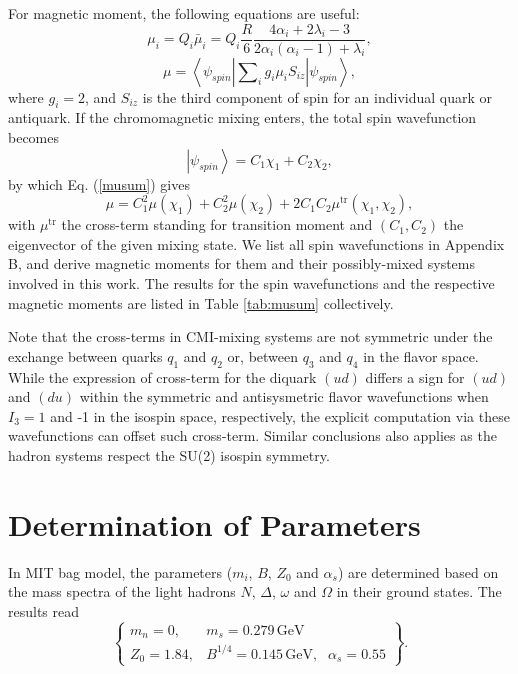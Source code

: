 \documentclass[prd,twocolumn,floatfix,nofootinbib]{revtex4}
\begin{document}
For magnetic moment, the following equations \cite%
{DeGrand:1975cf,Wang:2016dzu} are useful:
\begin{equation}
\mu _{i}=Q_{i}\bar{\mu}_{i}=Q_{i}\frac{R}{6}\frac{4\alpha _{i}+2\lambda
_{i}-3}{2\alpha _{i}\left( \alpha _{i}-1\right) +\lambda _{i}},  \label{mui}
\end{equation}%
\begin{equation}
\mu =\left\langle \psi _{spin}\left\vert \sum\nolimits_{i}g_{i}\mu
_{i}S_{iz}\right\vert \psi _{spin}\right\rangle ,  \label{musum}
\end{equation}%
where $g_{i}=2$, and $S_{iz}$ is the third component of spin for an
individual quark or antiquark. If the chromomagnetic mixing enters, the
total spin wavefunction becomes
\begin{equation}
\left\vert \psi _{spin}\right\rangle =C_{1}\chi _{1}+C_{2}\chi _{2},
\end{equation}%
by which Eq. (\ref{musum}) gives
\begin{equation}
\mu =C_{1}^{2}\mu \left( \chi _{1}\right) +C_{2}^{2}\mu \left( \chi
_{2}\right) +2C_{1}C_{2}\mu ^{\mathrm{tr}}\left( \chi _{1},\chi _{2}\right) ,
\end{equation}%
with $\mu ^{\mathrm{tr}}$ the cross-term standing for transition moment \cite%
{Bernotas:2012nz} and $(C_{1},C_{2})$ the eigenvector of the given mixing
state. We list all spin wavefunctions in Appendix B, and derive magnetic
moments for them and their possibly-mixed systems involved in this work. The
results for the spin wavefunctions and the respective magnetic moments are
listed in Table \ref{tab:musum} collectively.

Note that the cross-terms in CMI-mixing systems are not symmetric under the
exchange between quarks $q_{1}$ and $q_{2}$ or, between $q_{3}$ and $q_{4}$
in the flavor space. While the expression of cross-term for the diquark $%
(ud) $ differs a sign for $(ud)$ and $(du)$ within the symmetric and
antisysmetric flavor wavefunctions when $I_{3}=1$ and -1 in the isospin
space, respectively, the explicit computation via these wavefunctions can
offset such cross-term. Similar conclusions also applies as the hadron
systems respect the SU(2) isospin symmetry.

\section{Determination of Parameters}

\label{Parameters} In MIT bag model, the parameters ($m_{i}$, $B$, $Z_{0}$
and $\alpha _{s}$) are determined based on the mass spectra of the light
hadrons $N$, $\Delta $, $\omega $ and $\Omega $ in their ground states. The
results read \cite{DeGrand:1975cf}
\begin{equation}
\begin{Bmatrix}
m_{n}=0, & m_{s}=0.279\,\text{GeV} &  \\
Z_{0}=1.84, & B^{1/4}=0.145\,\text{GeV,} & \alpha _{s}=0.55%
\end{Bmatrix}%
.  \label{oripar}
\end{equation}
\end{document}
